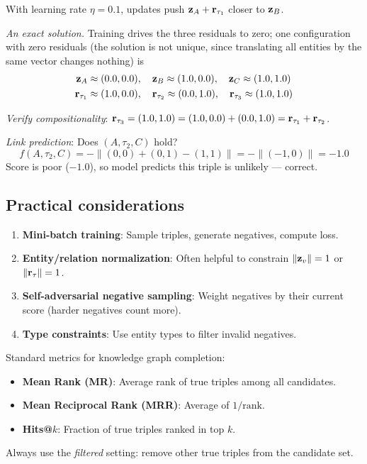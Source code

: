 \begin{notechapter}
\begin{example}
With learning rate $\eta = 0.1$, updates push $\mathbf{z}_A + \mathbf{r}_{\tau_1}$ closer to $\mathbf{z}_B$.

\emph{An exact solution.} Training drives the three residuals to zero; one configuration with zero residuals (the solution is not unique, since translating all entities by the same vector changes nothing) is
\begin{align*}
\mathbf{z}_A &\approx (0.0, 0.0), \quad \mathbf{z}_B \approx (1.0, 0.0), \quad \mathbf{z}_C \approx (1.0, 1.0) \\
\mathbf{r}_{\tau_1} &\approx (1.0, 0.0), \quad \mathbf{r}_{\tau_2} \approx (0.0, 1.0), \quad \mathbf{r}_{\tau_3} \approx (1.0, 1.0)
\end{align*}

\emph{Verify compositionality}: $\mathbf{r}_{\tau_3} = (1.0, 1.0) = (1.0, 0.0) + (0.0, 1.0) = \mathbf{r}_{\tau_1} + \mathbf{r}_{\tau_2}$.

\emph{Link prediction}: Does $(A, \tau_2, C)$ hold?
\[
f(A, \tau_2, C) = -\|(0, 0) + (0, 1) - (1, 1)\| = -\|(-1, 0)\| = -1.0
\]
Score is poor ($-1.0$), so model predicts this triple is unlikely --- correct.
\end{example}

\subsection{Practical considerations}

\begin{remark}
\leavevmode
\begin{enumerate}
    \item \textbf{Mini-batch training}: Sample triples, generate negatives, compute loss.
    \item \textbf{Entity/relation normalization}: Often helpful to constrain $\|\mathbf{z}_v\| = 1$ or $\|\mathbf{r}_\tau\| = 1$.
    \item \textbf{Self-adversarial negative sampling}: Weight negatives by their current score (harder negatives count more).
    \item \textbf{Type constraints}: Use entity types to filter invalid negatives.
\end{enumerate}
\end{remark}

\begin{remark}
\leavevmode
Standard metrics for knowledge graph completion:
\begin{itemize}
    \item \textbf{Mean Rank (MR)}: Average rank of true triples among all candidates.
    \item \textbf{Mean Reciprocal Rank (MRR)}: Average of $1/\text{rank}$.
    \item \textbf{Hits@$k$}: Fraction of true triples ranked in top $k$.
\end{itemize}
Always use the \emph{filtered} setting: remove other true triples from the candidate set.
\end{remark}


\end{notechapter}
